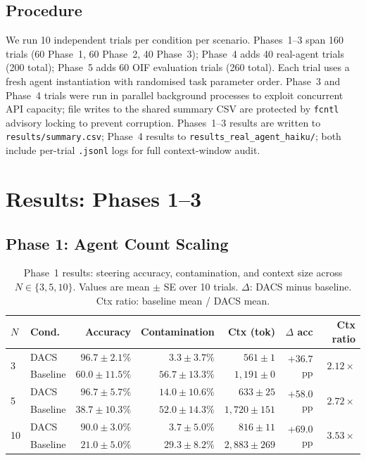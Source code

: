 \documentclass{article}
\begin{document}
\subsection{Procedure}
\label{sec:procedure}

We run 10 independent trials per condition per scenario.
Phases~1--3 span 160 trials (60 Phase~1, 60 Phase~2, 40 Phase~3);
Phase~4 adds 40 real-agent trials (200 total);
Phase~5 adds 60 OIF evaluation trials (260 total).
Each trial uses a fresh agent instantiation with randomised task parameter
order. Phase~3 and Phase~4 trials were run in parallel background processes
to exploit concurrent API capacity; file writes to the shared summary CSV
are protected by \texttt{fcntl} advisory locking to prevent corruption.
Phases~1--3 results are written to \texttt{results/summary.csv};
Phase~4 results to \texttt{results\_real\_agent\_haiku/};
both include per-trial \texttt{.jsonl} logs for full context-window audit.

\section{Results: Phases 1--3}
\label{sec:results}

\subsection{Phase 1: Agent Count Scaling}

\begin{table}[t]
\caption{Phase~1 results: steering accuracy, contamination, and context
size across $N \in \{3,5,10\}$.
Values are mean $\pm$ SE over 10 trials.
$\Delta$: DACS minus baseline.
Ctx ratio: baseline mean / DACS mean.}
\label{tab:phase1}
\centering
\small
\begin{tabular}{llrrrrr}
\toprule
$N$ & Cond. & Accuracy & Contamination & Ctx (tok) & $\Delta$ acc & Ctx ratio \\
\midrule
\multirow{2}{*}{3}
  & DACS     & $96.7\pm2.1\%$ & $3.3\pm3.7\%$  & $561\pm1$   & \multirow{2}{*}{$+36.7$pp} & \multirow{2}{*}{$2.12\times$} \\
  & Baseline & $60.0\pm11.5\%$ & $56.7\pm13.3\%$ & $1{,}191\pm0$ & & \\[4pt]
\multirow{2}{*}{5}
  & DACS     & $96.7\pm5.7\%$ & $14.0\pm10.6\%$ & $633\pm25$  & \multirow{2}{*}{$+58.0$pp} & \multirow{2}{*}{$2.72\times$} \\
  & Baseline & $38.7\pm10.3\%$ & $52.0\pm14.3\%$ & $1{,}720\pm151$ & & \\[4pt]
\multirow{2}{*}{10}
  & DACS     & $90.0\pm3.0\%$ & $3.7\pm5.0\%$  & $816\pm11$  & \multirow{2}{*}{$+69.0$pp} & \multirow{2}{*}{$3.53\times$} \\
  & Baseline & $21.0\pm5.0\%$ & $29.3\pm8.2\%$ & $2{,}883\pm269$ & & \\
\bottomrule
\end{tabular}
\end{table}
\end{document}
